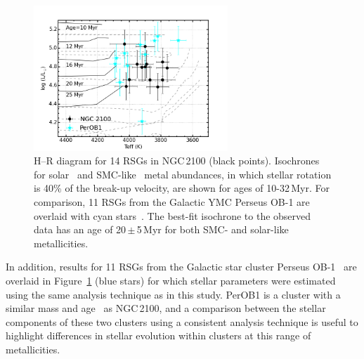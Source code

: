 \begin{figure}
\centering
 \includegraphics[width=0.65\textwidth]{ngc2100/NGC2100-HRD-perOB1}
 \caption{H--R diagram for 14 RSGs in NGC\,2100 (black points).
  Isochrones for solar~\citep[dashed grey lines;][]{2012A&A...537A.146E} and SMC-like~\citep[solid black lines;][]{2013A&A...558A.103G} metal abundances,
  in which stellar rotation is 40\% of the break-up velocity, are shown for ages of 10-32\,Myr. For comparison, 11 RSGs from the Galactic YMC Perseus OB-1 are overlaid with cyan stars~\citep{2014ApJ...788...58G}.
  The best-fit isochrone to the observed data has an age of 20\,$\pm$\,5\,Myr for both SMC- and solar-like metallicities.
  \label{fig:HRD}
          }
\end{figure}

In addition, results for 11 RSGs from the Galactic star cluster Perseus OB-1~\citep[PerOB1;][]{2014ApJ...787..142G} are overlaid in Figure~\ref{fig:HRD} (blue stars) for which stellar parameters were estimated using the same analysis technique as in this study.
PerOB1 is a cluster with a similar mass and age~\citep[$2\times10^{4}\,$M$_{\odot}$ and 14\,Myr respectively;][]{2010ApJS..186..191C}
as NGC\,2100, and a comparison between the stellar components of these two clusters using a consistent analysis technique is useful to highlight differences in stellar evolution within clusters at this range of metallicities.

